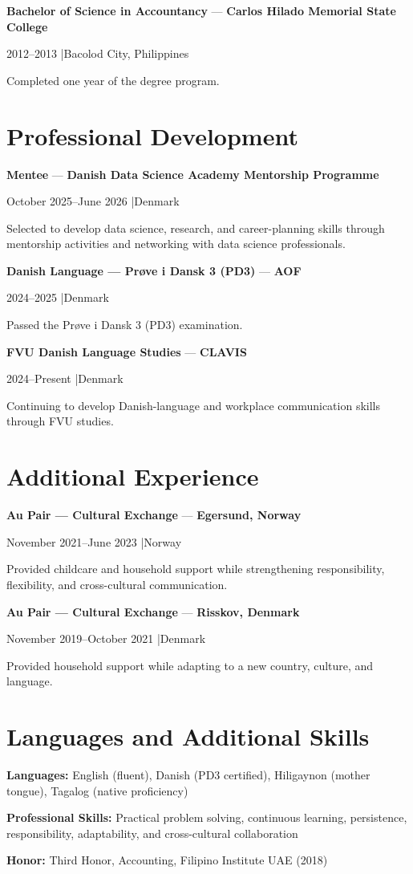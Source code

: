 \documentclass[10pt,a4paper]{article}
\newcommand{\role}[4]{%
  \textbf{#1} --- \textbf{#2}\par
  #3 \enspace|\enspace #4\par
}
\begin{document}
\role{Bachelor of Science in Accountancy}{Carlos Hilado Memorial State College}{2012--2013}{Bacolod City, Philippines}
Completed one year of the degree program.

\section{Professional Development}
\role{Mentee}{Danish Data Science Academy Mentorship Programme}{October 2025--June 2026}{Denmark}
Selected to develop data science, research, and career-planning skills through mentorship activities and networking with data science professionals.

\role{Danish Language --- Pr\o ve i Dansk 3 (PD3)}{AOF}{2024--2025}{Denmark}
Passed the Pr\o ve i Dansk 3 (PD3) examination.

\role{FVU Danish Language Studies}{CLAVIS}{2024--Present}{Denmark}
Continuing to develop Danish-language and workplace communication skills through FVU studies.

\section{Additional Experience}
\role{Au Pair --- Cultural Exchange}{Egersund, Norway}{November 2021--June 2023}{Norway}
Provided childcare and household support while strengthening responsibility, flexibility, and cross-cultural communication.

\role{Au Pair --- Cultural Exchange}{Risskov, Denmark}{November 2019--October 2021}{Denmark}
Provided household support while adapting to a new country, culture, and language.

\section{Languages and Additional Skills}
\textbf{Languages:} English (fluent), Danish (PD3 certified), Hiligaynon (mother tongue), Tagalog (native proficiency)\par
\textbf{Professional Skills:} Practical problem solving, continuous learning, persistence, responsibility, adaptability, and cross-cultural collaboration\par
\textbf{Honor:} Third Honor, Accounting, Filipino Institute UAE (2018)
\end{document}
